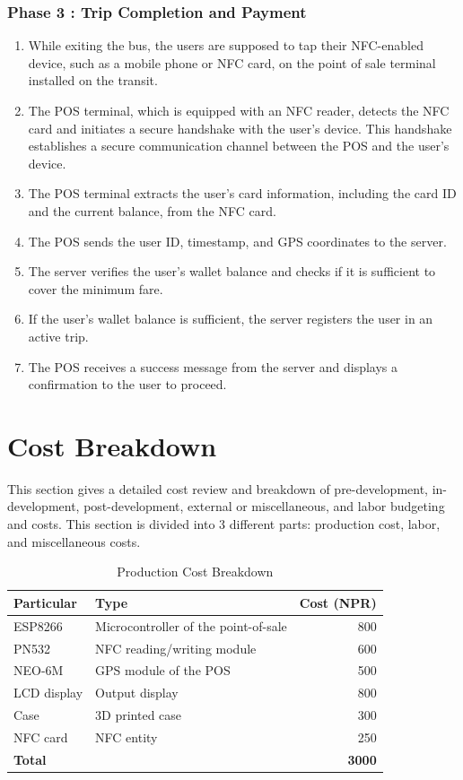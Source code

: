 \documentclass[sigconf, nonacm]{acmart}
\begin{document}
\subsubsection{Phase 3 : Trip Completion and Payment}
\begin{enumerate}
  \item While exiting the bus, the users are supposed to tap their NFC-enabled device, such as a mobile phone or NFC card, on the point of sale terminal installed on the transit.
  \item The POS terminal, which is equipped with an NFC reader, detects the NFC card and initiates a secure handshake with the user's device. This handshake establishes a secure communication channel between the POS and the user's device.
  \item The POS terminal extracts the user's card information, including the card ID and the current balance, from the NFC card.
  \item The POS sends the user ID, timestamp, and GPS coordinates to the server.
  \item The server verifies the user's wallet balance and checks if it is sufficient to cover the minimum fare.
  \item If the user's wallet balance is sufficient, the server registers the user in an active trip.
  \item The POS receives a success message from the server and displays a confirmation to the user to proceed.
\end{enumerate}
 \section{Cost Breakdown}
This section gives a detailed cost review and breakdown of pre-development, in-development, post-development, external or miscellaneous, and labor budgeting and costs. This section is divided into 3 different parts: production cost, labor, and miscellaneous costs.

\begin{table}[H]
  \centering
  \caption{Production Cost Breakdown}
  \label{tab:production_cost}
  \begin{tabularx}{\columnwidth}{p{5em} L r}
    \toprule
    \textbf{Particular} & \textbf{Type} & \textbf{Cost (NPR)} \\
    \midrule
    ESP8266 & Microcontroller of the point-of-sale & 800 \\
    PN532 & NFC reading/writing module & 600 \\
    NEO-6M & GPS module of the POS & 500 \\
    LCD display & Output display & 800 \\
    Case & 3D printed case & 300 \\
    NFC card & NFC entity & 250 \\
    \midrule
    \textbf{Total} & & \textbf{3000} \\
    \bottomrule
  \end{tabularx}
\end{table}
\end{document}
